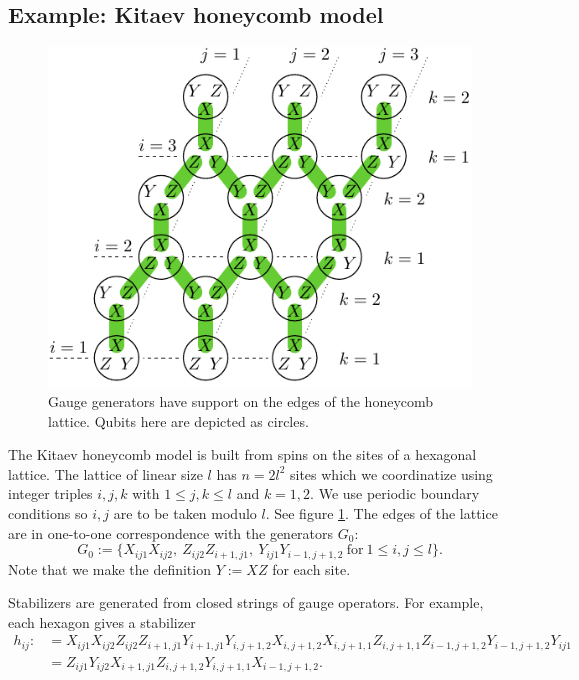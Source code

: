\documentclass[12pt,notitlepage,longbibliography,nofootinbib,tightenlines]{revtex4}
\begin{document}
%
%

\subsection{Example: Kitaev honeycomb model}


\begin{figure}[th!]
\begin{center}
        \includegraphics[width=0.6\columnwidth]{fig_00.pdf}
\caption{
Gauge generators have support on the edges of the honeycomb lattice.
Qubits here are depicted as circles.
}
\label{honeycomb}
\end{center}
\end{figure}


The Kitaev honeycomb model \cite{Kitaev2006} is built from spins on
the sites of a hexagonal lattice. 
The lattice of linear size $l$ has $n=2l^2$ sites
which we coordinatize using integer triples $i, j, k$
with $1\le j, k\le l$ and $k=1, 2.$
We use periodic boundary conditions so $i, j$ are
to be taken modulo $l$.
See figure \ref{honeycomb}.
The edges of the lattice are in one-to-one
correspondence with the generators $G_0$:
$$
G_0 := \big\{X_{ij1}X_{ij2},\ Z_{ij2}Z_{i+1,j1},\ Y_{ij1}Y_{i-1,j+1,2}
\ \mbox{for}\ 1\le i,j\le l\big\}.
$$
Note that we make the definition $Y:=XZ$ for each site.

Stabilizers are generated from closed strings of
gauge operators. 
For example, each hexagon gives a stabilizer
\begin{align*}
h_{ij}:&= 
X_{ij1}X_{ij2}
Z_{ij2}Z_{i+1,j1}
Y_{i+1,j1}Y_{i,j+1,2}
X_{i,j+1,2}X_{i,j+1,1}
Z_{i,j+1,1}Z_{i-1,j+1,2}
Y_{i-1,j+1,2}Y_{ij1}
\\
&= 
Z_{ij1} Y_{ij2} X_{i+1,j1}
Z_{i,j+1,2} Y_{i,j+1,1} X_{i-1,j+1,2}.
\end{align*}
\end{document}
